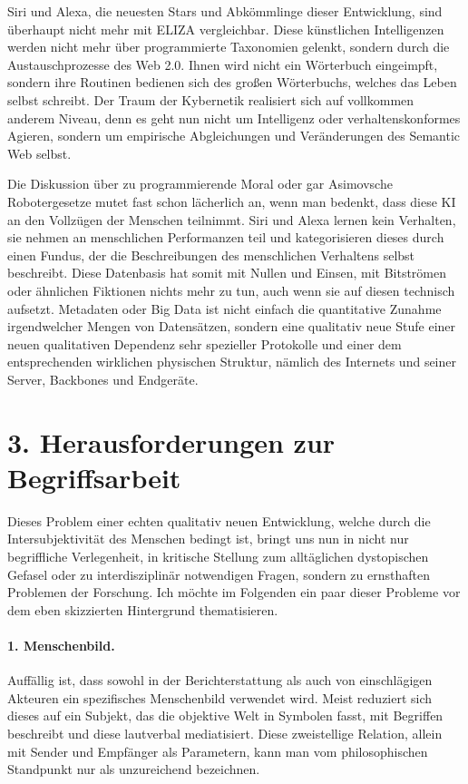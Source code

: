 \documentclass[a4paper,11pt]{article}
\begin{document}
Siri und Alexa, die neuesten Stars und Abkömmlinge dieser Entwicklung, sind
überhaupt nicht mehr mit ELIZA vergleichbar. Diese künstlichen Intelligenzen
werden nicht mehr über programmierte Taxonomien gelenkt, sondern durch die
Austauschprozesse des Web 2.0. Ihnen wird nicht ein Wörterbuch eingeimpft,
sondern ihre Routinen bedienen sich des großen Wörterbuchs, welches das Leben
selbst schreibt. Der Traum der Kybernetik realisiert sich auf vollkommen
anderem Niveau, denn es geht nun nicht um Intelligenz oder verhaltenskonformes
Agieren, sondern um empirische Abgleichungen und Veränderungen des Semantic
Web selbst.

Die Diskussion über zu programmierende Moral oder gar Asimovsche
Robotergesetze mutet fast schon lächerlich an, wenn man bedenkt, dass diese KI
an den Vollzügen der Menschen teilnimmt. Siri und Alexa lernen kein Verhalten,
sie nehmen an menschlichen Performanzen teil und kategorisieren dieses durch
einen Fundus, der die Beschreibungen des menschlichen Verhaltens selbst
beschreibt.  Diese Datenbasis hat somit mit Nullen und Einsen, mit Bitströmen
oder ähnlichen Fiktionen nichts mehr zu tun, auch wenn sie auf diesen
technisch aufsetzt. Metadaten oder Big Data ist nicht einfach die quantitative
Zunahme irgendwelcher Mengen von Datensätzen, sondern eine qualitativ neue
Stufe einer neuen qualitativen Dependenz sehr spezieller Protokolle und einer
dem entsprechenden wirklichen physischen Struktur, nämlich des Internets und
seiner Server, Backbones und Endgeräte.

\section*{3. Herausforderungen zur Begriffsarbeit}

Dieses Problem einer echten qualitativ neuen Entwicklung, welche durch die
Intersubjektivität des Menschen bedingt ist, bringt uns nun in nicht nur
begriffliche Verlegenheit, in kritische Stellung zum alltäglichen dystopischen
Gefasel oder zu interdisziplinär notwendigen Fragen, sondern zu ernsthaften
Problemen der Forschung. Ich möchte im Folgenden ein paar dieser Probleme vor
dem eben skizzierten Hintergrund thematisieren.
\enlargethispage{1em}

\paragraph{1. Menschenbild.}
Auffällig ist, dass sowohl in der Berichterstattung als auch von einschlägigen
Akteuren ein spezifisches Menschenbild verwendet wird. Meist reduziert sich
dieses auf ein Subjekt, das die objektive Welt in Symbolen fasst, mit
Begriffen beschreibt und diese lautverbal mediatisiert. Diese zweistellige
Relation, allein mit Sender und Empfänger als Parametern, kann man vom
philosophischen Standpunkt nur als unzureichend bezeichnen.
\end{document}
